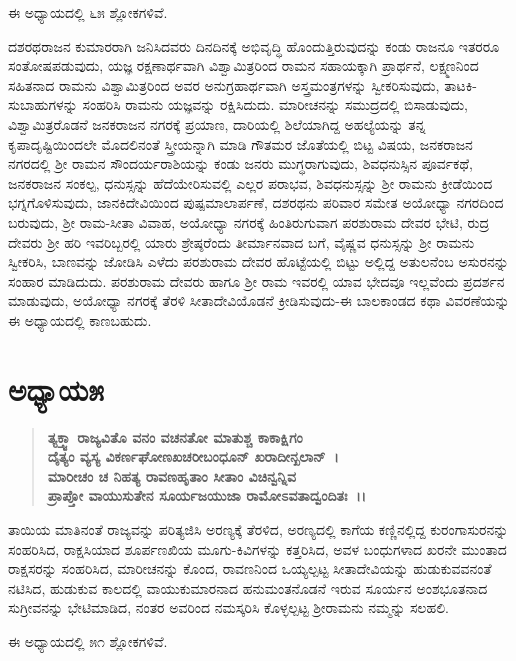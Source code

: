 ಈ ಅಧ್ಯಾಯದಲ್ಲಿ ೬೫ ಶ್ಲೋಕಗಳಿವೆ.

ದಶರಥರಾಜನ ಕುಮಾರರಾಗಿ ಜನಿಸಿದವರು ದಿನದಿನಕ್ಕೆ ಅಭಿವೃದ್ಧಿ ಹೊಂದುತ್ತಿರುವುದನ್ನು ಕಂಡು ರಾಜನೂ ಇತರರೂ ಸಂತೋಷಪಡುವುದು, ಯಜ್ಞ ರಕ್ಷಣಾರ್ಥವಾಗಿ ವಿಶ್ವಾಮಿತ್ರರಿಂದ ರಾಮನ ಸಹಾಯಕ್ಕಾಗಿ ಪ್ರಾರ್ಥನೆ, ಲಕ್ಷ್ಮಣನಿಂದ ಸಹಿತನಾದ ರಾಮನು ವಿಶ್ವಾಮಿತ್ರರಿಂದ ಅವರ ಅನುಗ್ರಹಾರ್ಥವಾಗಿ ಅಸ್ತ್ರಮಂತ್ರಗಳನ್ನು ಸ್ವೀಕರಿಸುವುದು, ತಾಟಕಿ-ಸುಬಾಹುಗಳನ್ನು ಸಂಹರಿಸಿ ರಾಮನು ಯಜ್ಞವನ್ನು ರಕ್ಷಿಸಿದುದು. ಮಾರೀಚನನ್ನು ಸಮುದ್ರದಲ್ಲಿ ಬಿಸಾಡುವುದು, ವಿಶ್ವಾಮಿತ್ರರೊಡನೆ ಜನಕರಾಜನ ನಗರಕ್ಕೆ ಪ್ರಯಾಣ, ದಾರಿಯಲ್ಲಿ ಶಿಲೆಯಾಗಿದ್ದ ಅಹಲ್ಯೆಯನ್ನು ತನ್ನ ಕೃಪಾದೃಷ್ಟಿಯಿಂದಲೇ ಮೊದಲಿನಂತೆ ಸ್ತ್ರೀಯನ್ನಾಗಿ ಮಾಡಿ ಗೌತಮರ ಜೊತೆಯಲ್ಲಿ ಬಿಟ್ಟ ವಿಷಯ, ಜನಕರಾಜನ ನಗರದಲ್ಲಿ ಶ‍್ರೀ ರಾಮನ ಸೌಂದರ್ಯರಾಶಿಯನ್ನು ಕಂಡು ಜನರು ಮುಗ್ಧರಾಗುವುದು, ಶಿವಧನುಸ್ಸಿನ ಪೂರ್ವಕಥೆ, ಜನಕರಾಜನ ಸಂಕಲ್ಪ, ಧನುಸ್ಸನ್ನು ಹೆದೆಯೇರಿಸುವಲ್ಲಿ ಎಲ್ಲರ ಪರಾಭವ, ಶಿವಧನುಸ್ಸನ್ನು ಶ‍್ರೀ ರಾಮನು ಕ್ರೀಡೆಯಿಂದ ಭಗ್ನಗೊಳಿಸುವುದು, ಜಾನಕಿದೇವಿಯಿಂದ ಪುಷ್ಪಮಾಲಾರ್ಪಣೆ, ದಶರಥನು ಪರಿವಾರ ಸಮೇತ ಅಯೋಧ್ಯಾ ನಗರದಿಂದ ಬರುವುದು, ಶ‍್ರೀ ರಾಮ-ಸೀತಾ ವಿವಾಹ, ಅಯೋಧ್ಯಾ ನಗರಕ್ಕೆ ಹಿಂತಿರುಗುವಾಗ ಪರಶುರಾಮ ದೇವರ ಭೇಟಿ, ರುದ್ರ ದೇವರು ಶ‍್ರೀ ಹರಿ ಇವರಿಬ್ಬರಲ್ಲಿ ಯಾರು ಶ್ರೇಷ್ಠರೆಂದು ತೀರ್ಮಾನವಾದ ಬಗೆ, ವೈಷ್ಣವ ಧನುಸ್ಸನ್ನು ಶ‍್ರೀ ರಾಮನು ಸ್ವೀಕರಿಸಿ, ಬಾಣವನ್ನು ಜೋಡಿಸಿ ಎಳೆದು ಪರಶುರಾಮ ದೇವರ ಹೊಟ್ಟೆಯಲ್ಲಿ ಬಿಟ್ಟು ಅಲ್ಲಿದ್ದ ಅತುಲನೆಂಬ ಅಸುರನನ್ನು ಸಂಹಾರ ಮಾಡಿದುದು. ಪರಶುರಾಮ ದೇವರು ಹಾಗೂ ಶ‍್ರೀ ರಾಮ ಇವರಲ್ಲಿ ಯಾವ ಭೇದವೂ ಇಲ್ಲವೆಂದು ಪ್ರದರ್ಶನ ಮಾಡುವುದು, ಅಯೋಧ್ಯಾ ನಗರಕ್ಕೆ ತೆರಳಿ ಸೀತಾದೇವಿಯೊಡನೆ ಕ್ರೀಡಿಸುವುದು-ಈ ಬಾಲಕಾಂಡದ ಕಥಾ ವಿವರಣೆಯನ್ನು ಈ ಅಧ್ಯಾಯದಲ್ಲಿ ಕಾಣಬಹುದು.


\section*{ಅಧ್ಯಾಯ\enginline{-}೫}

\begin{verse}
\textbf{ತ್ಯಕ್ತ್ವಾ ರಾಜ್ಯವಿತೊ ವನಂ ವಚನತೋ ಮಾತುಶ್ಚ ಕಾಕಾಕ್ಷಿಗಂ} \\\textbf{ದೈತ್ಯಂ ವ್ಯಸ್ಯ ವಿಕರ್ಣಘೋಣಖಚರೀಬಂಧೂನ್ ಖರಾದೀನ್ಖಲಾನ್~।}\\\textbf{ಮಾರೀಚಂ ಚ ನಿಹತ್ಯ ರಾವಣಹೃತಾಂ ಸೀತಾಂ ವಿಚಿನ್ವನ್ನಿವ} \\\textbf{ಪ್ರಾಪ್ತೋ ವಾಯುಸುತೇನ ಸೂರ್ಯಜಯುಜಾ ರಾಮೋಽವತಾದ್ವಂದಿತಃ~।।}
\end{verse}

ತಾಯಿಯ ಮಾತಿನಂತೆ ರಾಜ್ಯವನ್ನು ಪರಿತ್ಯಜಿಸಿ ಅರಣ್ಯಕ್ಕೆ ತೆರಳಿದ, ಅರಣ್ಯದಲ್ಲಿ ಕಾಗೆಯ ಕಣ್ಣಿನಲ್ಲಿದ್ದ ಕುರಂಗಾಸುರನನ್ನು ಸಂಹರಿಸಿದ, ರಾಕ್ಷಸಿಯಾದ ಶೂರ್ಪಣಖಿಯ ಮೂಗು-ಕಿವಿಗಳನ್ನು ಕತ್ತರಿಸಿದ, ಅವಳ ಬಂಧುಗಳಾದ ಖರನೇ ಮುಂತಾದ ರಾಕ್ಷಸರನ್ನು ಸಂಹರಿಸಿದ, ಮಾರೀಚನನ್ನು ಕೊಂದ, ರಾವಣನಿಂದ ಒಯ್ಯಲ್ಪಟ್ಟ ಸೀತಾದೇವಿಯನ್ನು ಹುಡುಕುವವನಂತೆ ನಟಿಸಿದ, ಹುಡುಕುವ ಕಾಲದಲ್ಲಿ ವಾಯುಕುಮಾರನಾದ ಹನುಮಂತನೊಡನೆ ಇರುವ ಸೂರ್ಯನ ಅಂಶಭೂತನಾದ ಸುಗ್ರೀವನನ್ನು ಭೇಟಿಮಾಡಿದ, ನಂತರ ಅವರಿಂದ ನಮಸ್ಕರಿಸಿ ಕೊಳ್ಳಲ್ಪಟ್ಟ ಶ‍್ರೀರಾಮನು ನಮ್ಮನ್ನು ಸಲಹಲಿ.

ಈ ಅಧ್ಯಾಯದಲ್ಲಿ ೫೧ ಶ್ಲೋಕಗಳಿವೆ.

